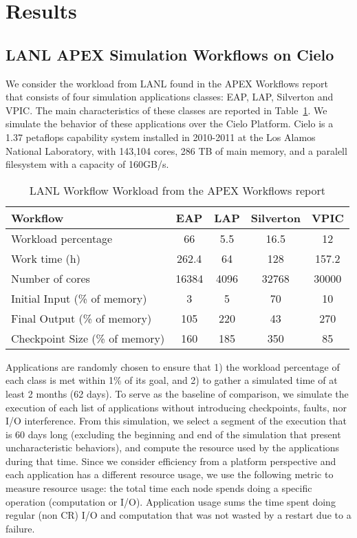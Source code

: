 
\section{Results}\label{sec:results}

\subsection{LANL APEX Simulation Workflows on Cielo}

We consider the workload from LANL found in the APEX Workflows
report~\cite{apex2016} that consists of four simulation applications
classes: EAP, LAP, Silverton and VPIC. The main characteristics of
these classes are reported in Table~\ref{table:lanl}. We simulate the
behavior of these applications over the Cielo Platform. Cielo is a
1.37 petaflops capability system installed in 2010-2011 at the Los
Alamos National Laboratory, with 143,104 cores, 286 TB of main memory,
and a paralell filesystem with a capacity of 160GB/s.

\begin{table}
\begin{tabular}{|l|c|c|c|c|}
\hline
 Workflow & EAP & LAP & Silverton & VPIC \\\hline
Workload percentage & 66 & 5.5 & 16.5 & 12 \\\hline
Work time (h) & 262.4 & 64 & 128 & 157.2 \\\hline
Number of cores & 16384 & 4096 & 32768 & 30000 \\\hline
Initial Input (\% of memory) &  3 & 5 & 70 & 10 \\\hline
Final Output (\% of memory) & 105 & 220 & 43 & 270 \\\hline
Checkpoint Size (\% of memory) & 160 & 185 & 350 & 85 \\\hline
\end{tabular}
\caption{LANL Workflow Workload from the APEX Workflows report\label{table:lanl}}
\end{table}

Applications are randomly chosen to ensure that 1) the workload
percentage of each class is met within 1\% of its goal, and 2) to
gather a simulated time of at least 2 months (62 days). To serve as
the baseline of comparison, we simulate the execution of each list of
applications without introducing checkpoints, faults, nor I/O
interference. From this simulation, we select a segment of the
execution that is 60 days long (excluding the beginning and end of the
simulation that present uncharacteristic behaviors), and compute the
resource used by the applications during that time. Since we consider
efficiency from a platform perspective and each application has a
different resource usage, we use the following metric to measure
resource usage: the total time each node spends doing a specific
operation (computation or I/O). Application usage sums the time spent
doing regular (non CR) I/O and computation that was not wasted by a
restart due to a failure.

